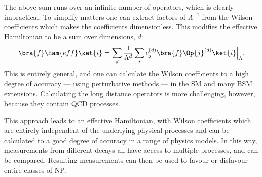 The above sum runs over an infinite number of operators, which is clearly impractical.
To simplify matters one can extract factors of $\Lambda^{-1}$ from the Wilson coefficients which
makes the coefficients dimensionless.
This modifies the effective Hamiltonian to be a sum over dimensions, $d$:
\begin{equation}
  \bra{f}\Ham{eff}\ket{i} =
  \sum_{d}\frac{1}{\Lambda^{d}}
  \sum_i c_j^{(d)}\bra{f}\Op{j}^{(d)}\ket{i}\Big|_{\Lambda}.
\end{equation}
This is entirely general, and one can calculate the Wilson coefficients to a high degree of
accuracy --- using perturbative methods --- in the SM and many BSM extensions.
Calculating the long distance operators is more challenging, however, because they contain QCD
processes.

This approach leads to an effective Hamiltonian, with Wilson coefficients which are entirely
independent of the underlying physical processes and can be calculated to a good degree of accuracy
in a range of physics models.
In this way, measurements from different decays all have access to multiple processes, and can be
compared.
Resulting measurements can then be used to favour or disfavour entire classes of NP.






